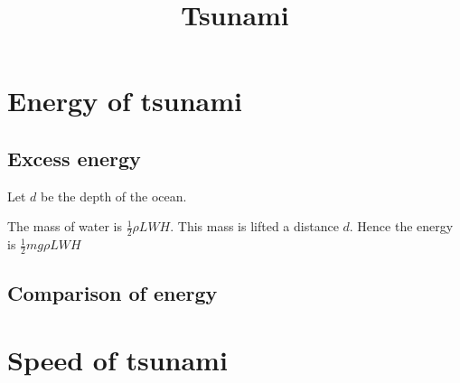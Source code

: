 \documentclass{article}
\title{Tsunami}
\date{}
\begin{document}
\maketitle

\section{Energy of tsunami}

\subsection{Excess energy}

Let $d$ be the depth of the ocean.

The mass of water is $\frac{1}{2} \rho LWH$. This mass is lifted a distance $d$. Hence the energy is $\frac{1}{2} mg \rho LWH$

\subsection{Comparison of energy}

\section{Speed of tsunami}
\end{document}
